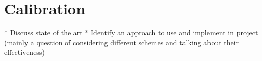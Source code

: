 \section{Calibration}\label{calibration}



* Discuss state of the art
* Identify an approach to use and implement in project (mainly a question of considering different schemes and talking about their effectiveness)
